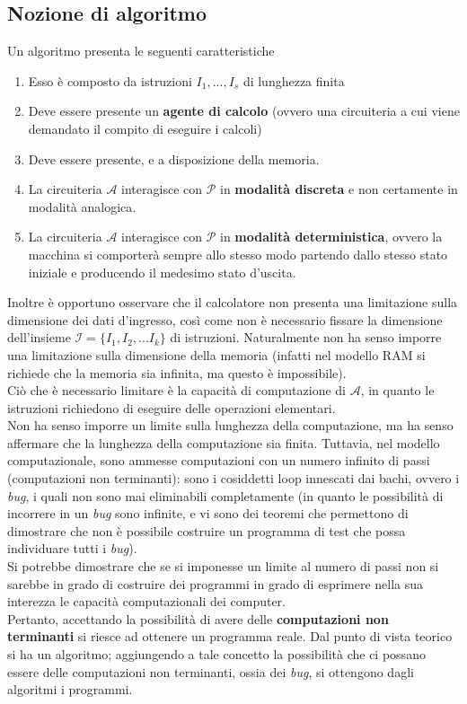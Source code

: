 \documentclass[a4paper]{extarticle}
\begin{document}
\vspace{1em}
\subsection{Nozione di algoritmo}
Un algoritmo presenta le seguenti caratteristiche
\begin{enumerate}
    \item Esso è composto da istruzioni \(I_1, ..., I_s\) di lunghezza finita
    \item Deve essere presente un \textbf{agente di calcolo} (ovvero una circuiteria a cui viene demandato il compito di eseguire i calcoli)
    \item Deve essere presente, e a disposizione della memoria.
    \item La circuiteria \(\mathcal{A}\) interagisce con \(\mathcal{P}\) in \textbf{modalità discreta} e non certamente in modalità analogica.
    \item La circuiteria \(\mathcal{A}\) interagisce con \(\mathcal{P}\) in \textbf{modalità deterministica}, ovvero la macchina si comporterà sempre allo stesso modo partendo dallo stesso stato iniziale e producendo il medesimo stato d'uscita.
\end{enumerate}
Inoltre è opportuno osservare che il calcolatore non presenta una limitazione sulla dimensione dei dati d'ingresso, così come non è necessario fissare la dimensione dell'insieme \(\mathcal{I} = \{I_1, I_2, ... I_k\}\) di istruzioni. Naturalmente non ha senso imporre una limitazione sulla dimensione della memoria (infatti nel modello RAM si richiede che la memoria sia infinita, ma questo è impossibile).\\
Ciò che è necessario limitare è la capacità di computazione di \(\mathcal{A}\), in quanto le istruzioni richiedono di eseguire delle operazioni elementari.\\
Non ha senso imporre un limite sulla lunghezza della computazione, ma ha senso affermare che la lunghezza della computazione sia finita. Tuttavia, nel modello computazionale, sono ammesse computazioni con un numero infinito di passi (computazioni non terminanti): sono i cosiddetti loop innescati dai bachi, ovvero i \textit{bug}, i quali non sono mai eliminabili completamente (in quanto le possibilità di incorrere in un \textit{bug} sono infinite, e vi sono dei teoremi che permettono di dimostrare che non è possibile costruire un programma di test che possa individuare tutti i \textit{bug}).\\
Si potrebbe dimostrare che se si imponesse un limite al numero di passi non si sarebbe in grado di costruire dei programmi in grado di esprimere nella sua interezza le capacità computazionali dei computer.\\
Pertanto, accettando la possibilità di avere delle \textbf{computazioni non terminanti} si riesce ad ottenere un programma reale. Dal punto di vista teorico si ha un algoritmo; aggiungendo a tale concetto la possibilità che ci possano essere delle computazioni non terminanti, ossia dei \textit{bug}, si ottengono dagli algoritmi i programmi.
\end{document}

